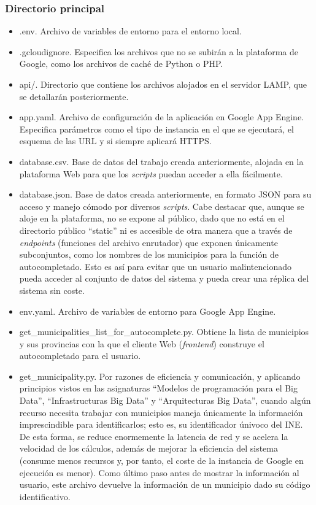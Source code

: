 \subsubsection{Directorio principal}

\begin{itemize}
	\item .env. Archivo de variables de entorno para el entorno local.
	\item .gcloudignore. Especifica los archivos que no se subirán a la plataforma de Google, como los archivos de caché de Python o PHP.
	\item api/. Directorio que contiene los archivos alojados en el servidor LAMP, que se detallarán posteriormente.
	\item app.yaml. Archivo de configuración de la aplicación en Google App Engine. Especifica parámetros como el tipo de instancia en el que se ejecutará, el esquema de las URL y si siempre aplicará HTTPS.
	\item database.csv. Base de datos del trabajo creada anteriormente, alojada en la plataforma Web para que los \textit{scripts} puedan acceder a ella fácilmente.
	\item database.json. Base de datos creada anteriormente, en formato JSON para su acceso y manejo cómodo por diversos \textit{scripts}. Cabe destacar que, aunque se aloje en la plataforma, no se expone al público, dado que no está en el directorio público ``static'' ni es accesible de otra manera que a través de \textit{endpoints} (funciones del archivo enrutador) que exponen únicamente subconjuntos, como los nombres de los municipios para la función de autocompletado. Esto es así para evitar que un usuario malintencionado pueda acceder al conjunto de datos del sistema y pueda crear una réplica del sistema sin coste.
	\item env.yaml. Archivo de variables de entorno para Google App Engine.
	\item get\_municipalities\_list\_for\_autocomplete.py. Obtiene la lista de municipios y sus provincias con la que el cliente Web (\textit{frontend}) construye el autocompletado para el usuario.
	\item get\_municipality.py. Por razones de eficiencia y comunicación, y aplicando principios vistos en las asignaturas ``Modelos de programación para el Big Data'', ``Infrastructuras Big Data'' y ``Arquitecturas Big Data'', cuando algún recurso necesita trabajar con municipios maneja únicamente la información imprescindible para identificarlos; esto es, su identificador únivoco del INE. De esta forma, se reduce enormemente la latencia de red y se acelera la velocidad de los cálculos, además de mejorar la eficiencia del sistema (consume menos recursos y, por tanto, el coste de la instancia de Google en ejecución es menor). Como último paso antes de mostrar la información al usuario, este archivo devuelve la información de un municipio dado su código identificativo.

\end{itemize}
